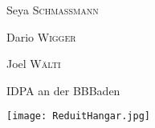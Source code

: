 \begin{titlepage}
            Seya \textsc{Schmassmann} %

            Dario \textsc{Wigger} %
            
			Joel \textsc{Wälti} %
	
	\vfill\vfill\vfill %
	
	{\large IDPA an der BBBaden} %
	
	
	\vfill\vfill
	\texttt{[image: ReduitHangar.jpg]}\\[1cm] %
	 
	
	\vfill %
	
\end{titlepage}